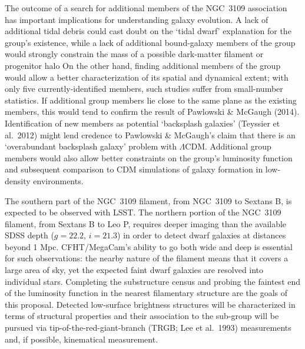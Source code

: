 The outcome of a search for additional members of the NGC~3109 association has important implications for
understanding galaxy evolution. A lack of additional tidal debris could cast doubt on the `tidal dwarf' 
explanation for the group's existence, while a lack of additional bound-galaxy members of the group 
would strongly constrain the mass of a possible dark-matter filament or progenitor halo
On the other hand, finding additional members of the group would allow a better characterization of its
spatial and dynamical extent; with only five currently-identified members, such studies 
suffer from small-number statistics. If additional group members lie close to the same plane
as the existing members, this would tend to confirm the result of Pawlowski \& McGaugh (2014). 
Identification of new members as potential `backsplash galaxies' (Teyssier et al.\ 2012) might lend credence to 
 Pawlowski \& McGaugh's
claim that there is an `overabundant backsplash galaxy' problem with $\Lambda$CDM.
Additional group members 
would also allow better constraints on the group's  luminosity function and subsequent comparison to CDM 
simulations of galaxy formation in  low-density environments.




The southern part of the NGC~3109 filament, from NGC~3109 to Sextans B, is expected to be observed with LSST.
The northern portion of  the NGC~3109 filament, from Sextans B to Leo P, requires deeper imaging than
the available  SDSS  depth ($g=22.2$, $i=21.3$) in order to detect dwarf galaxies at distances beyond 1 Mpc.
CFHT/MegaCam's ability to go both wide and deep is essential for such observations: the nearby nature of the 
filament means that it covers a large area of sky, yet the expected faint dwarf galaxies are resolved into individual stars.
Completing the substructure census and probing the faintest end of the luminosity function in the nearest filamentary 
structure are the goals of this proposal. Detected low-surface brightness structures will be characterized in terms of 
structural properties and their association to the sub-group will be pursued via tip-of-the-red-giant-branch 
(TRGB; Lee et al.\ 1993) measurements and, if possible, kinematical measurement.



